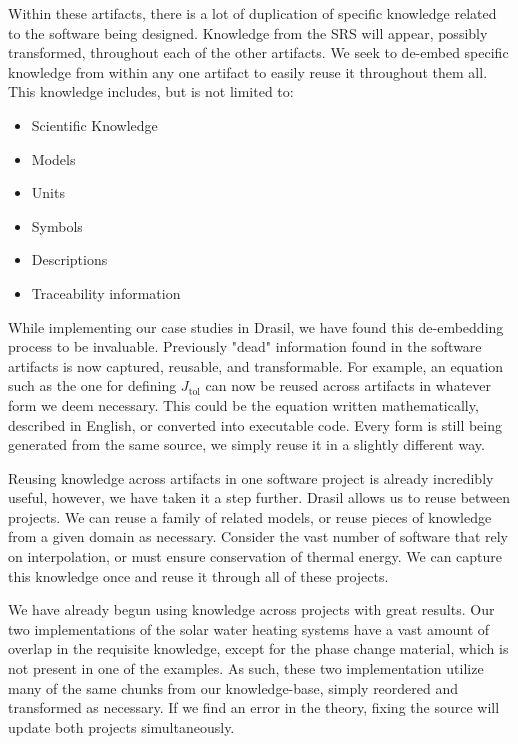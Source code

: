 \documentclass[sigconf]{acmart}
\newcommand{\jtol}{$J_{\mbox{tol}}$}
\begin{document}
{Within these artifacts, there is a lot of duplication of specific knowledge 
related to the software being designed. Knowledge from the SRS will appear, 
possibly transformed, throughout each of the other artifacts. We seek to 
de-embed specific knowledge from within any one artifact to easily reuse 
it throughout them all. This knowledge includes, but is not limited to:

\begin{itemize}
\item Scientific Knowledge
\item Models
\item Units
\item Symbols
\item Descriptions
\item Traceability information
\end{itemize}

While implementing our case studies in Drasil, we have found this de-embedding 
process to be invaluable. Previously "dead" information found in the software 
artifacts is now captured, reusable, and transformable. For example, an equation 
such as the one for defining \jtol{} can now be reused across artifacts in 
whatever form we deem necessary. This could be the equation written 
mathematically, described in English, or converted into executable code. Every 
form is still being generated from the same source, we simply reuse it in a 
slightly different way.

Reusing knowledge across artifacts in one software project is already 
incredibly useful, however, we have taken it a step further. Drasil allows us 
to reuse between projects. We can reuse a family of related models, or reuse 
pieces of knowledge from a given domain as necessary. Consider the vast number 
of software that rely on interpolation, or must ensure conservation of thermal 
energy. We can capture this knowledge once and reuse it through all of these 
projects.

We have already begun using knowledge across projects with great results. Our 
two implementations of the solar water heating systems have a vast amount of 
overlap in the requisite knowledge, except for the phase change material, which 
is not present in one of the examples. As such, these two implementation utilize 
many of the same chunks from our knowledge-base, simply reordered and 
transformed as necessary. If we find an error in the theory, fixing the source 
will update both projects simultaneously.

}
\end{document}
